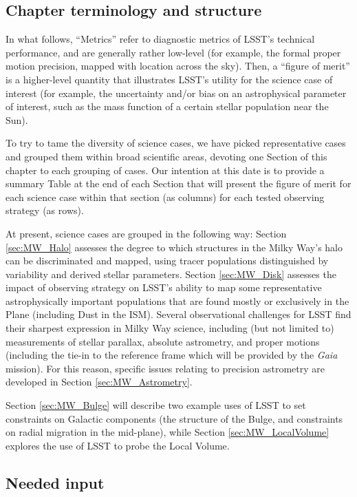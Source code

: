 \subsection{Chapter terminology and structure}

In what follows, ``Metrics'' refer to diagnostic metrics of LSST's
technical performance, and are generally rather low-level (for
example, the formal proper motion precision, mapped with location
across the sky). Then, a ``figure of merit'' is a higher-level
quantity that illustrates LSST's utility for the science case of
interest (for example, the uncertainty and/or bias on an astrophysical
parameter of interest, such as the mass function of a certain stellar
population near the Sun).

To try to tame the diversity of science cases, we have picked
representative cases and grouped them within broad scientific areas,
devoting one Section of this chapter to each grouping of cases. Our
intention at this date is to provide a summary Table at the end of
each Section that will present the figure of merit for each science
case within that section (as columns) for each tested observing
strategy (as rows).

At present, science cases are grouped in the following way: Section
\ref{sec:MW_Halo} assesses the degree to which structures in the Milky
Way's halo can be discriminated and mapped, using tracer populations
distinguished by variability and derived stellar parameters. Section
\ref{sec:MW_Disk} assesses the impact of observing strategy on LSST's
ability to map some representative astrophysically important
populations that are found mostly or exclusively in the Plane
(including Dust in the ISM). Several observational challenges for LSST
find their sharpest expression in Milky Way science, including (but
not limited to) measurements of stellar parallax, absolute astrometry,
and proper motions (including the tie-in to the reference frame which
will be provided by the {\it Gaia} mission). For this reason, specific
issues relating to precision astrometry are developed in Section
\ref{sec:MW_Astrometry}.

Section \ref{sec:MW_Bulge} will describe two example uses of LSST to
set constraints on Galactic components (the structure of the Bulge,
and constraints on radial migration in the mid-plane), while Section
\ref{sec:MW_LocalVolume} explores the use of LSST to probe the Local
Volume.

\subsection{Needed input}

